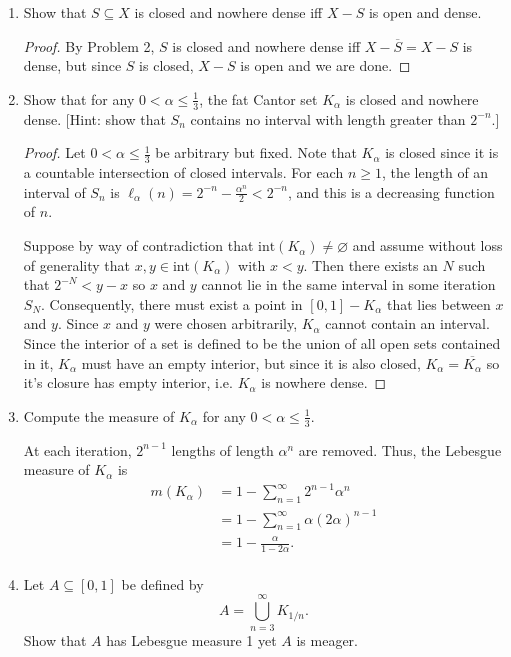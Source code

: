 \documentclass[11pt,oneside,english]{amsart}
\theoremstyle{definition}
\begin{document}
\begin{enumerate}
\item Show that $S\subseteq X$ is closed and nowhere dense iff $X-S$ is open and dense.

\begin{proof}
By Problem 2, $S$ is closed and nowhere dense iff $X-\overline{S}=X-S$ is dense, but since $S$ is closed, $X-S$ is open and we are done.
\end{proof}

\pagebreak


\item Show that for any $0<\alpha \leq \frac{1}{3}$, the fat Cantor set $K_\alpha$ is closed and nowhere dense. [Hint: show that $S_n$ contains no interval with length greater than $2^{-n}$.]

\begin{proof}
Let $0<\alpha\leq \frac{1}{3}$ be arbitrary but fixed. Note that $K_\alpha$ is closed since it is a countable intersection of closed intervals. For each $n\geq 1$, the length of an interval of $S_n$ is $\ell_\alpha(n)=2^{-n}-\frac{\alpha^n}{2}<2^{-n}$, and this is a decreasing function of $n$.

Suppose by way of contradiction that $\text{int}(K_\alpha)\neq\varnothing$ and assume without loss of generality that $x,y\in\text{int}(K_\alpha)$ with $x<y$. Then there exists an $N$ such that $2^{-N}<y-x$ so $x$ and $y$ cannot lie in the same interval in some iteration $S_N$. Consequently, there must exist a point in $[0,1]-K_\alpha$ that lies between $x$ and $y$. Since $x$ and $y$ were chosen arbitrarily, $K_\alpha$ cannot contain an interval. Since the interior of a set is defined to be the union of all open sets contained in it, $K_\alpha$ must have an empty interior, but since it is also closed, $K_\alpha=\overline{K_\alpha}$ so it's closure has empty interior, i.e. $K_\alpha$ is nowhere dense.
\end{proof}

\item Compute the measure of $K_\alpha$ for any $0<\alpha\leq\frac{1}{3}$.

At each iteration, $2^{n-1}$ lengths of length $\alpha^n$ are removed. Thus, the Lebesgue measure of $K_\alpha$ is 
\begin{align*}
m(K_\alpha)&=1-\sum_{n=1}^\infty 2^{n-1}\alpha^n\\[2mm]
&=1-\sum_{n=1}^\infty \alpha(2\alpha)^{n-1}\\[2mm]
&=1-\frac{\alpha}{1-2\alpha}.\\[2mm]
\end{align*}
\item Let $A\subseteq[0,1]$ be defined by
\[
A=\bigcup_{n=3}^\infty K_{1/n}.
\]
Show that $A$ has Lebesgue measure 1 yet $A$ is meager.


\end{enumerate}
\end{document}

